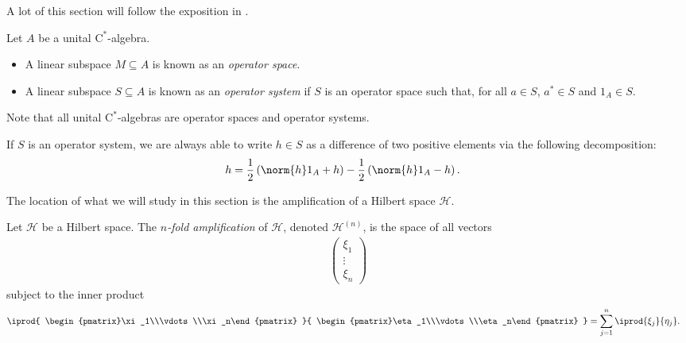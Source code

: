 A lot of this section will follow the exposition in \cite{completely_bounded_maps_and_operator_algebras}.
\begin{definition}\label{def:operator_systems_operator_spaces}
  Let $A$ be a unital $\mathrm{C}^{\ast}$-algebra.
  \begin{itemize}
    \item A linear subspace $M\subseteq A$ is known as an \textit{operator space}.
    \item A linear subspace $S\subseteq A$ is known as an \textit{operator system} if $S$ is an operator space such that, for all $a\in S$, $a^{\ast}\in S$ and $1_A \in S$.
  \end{itemize}
  Note that all unital $\mathrm{C}^{\ast}$-algebras are operator spaces and operator systems.
\end{definition}
\begin{remark}\label{rem:positive_elements_operator_system}
  If $S$ is an operator system, we are always able to write $h\in S$ as a difference of two positive elements via the following decomposition:
  \begin{align*}
    h &= \frac{1}{2}\left( \norm{h}1_A + h \right) - \frac{1}{2}\left( \norm{h}1_A - h \right).
  \end{align*}
\end{remark}
The location of what we will study in this section is the amplification of a Hilbert space $\mathcal{H}$.
\begin{definition}
  Let $\mathcal{H}$ be a Hilbert space. The \textit{$n$-fold amplification} of $\mathcal{H}$, denoted $\mathcal{H}^{(n)}$, is the space of all vectors
  \begin{align*}
    \begin{pmatrix}\xi_1\\\vdots\\\xi_n\end{pmatrix}
  \end{align*}
  subject to the inner product
  \begin{align*}
    \iprod{ \begin{pmatrix}\xi_1\\\vdots\\\xi_n\end{pmatrix} }{ \begin{pmatrix}\eta_1\\\vdots\\\eta_n\end{pmatrix} } &= \sum_{j=1}^{n} \iprod{\xi_j}{\eta_j}.
  \end{align*}
\end{definition}
